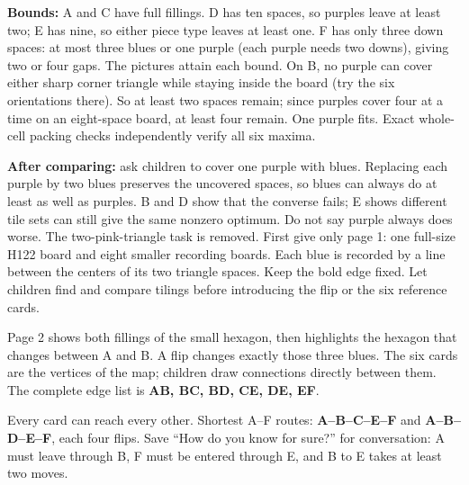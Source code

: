 \documentclass[11pt]{article}
\begin{document}
\textbf{Bounds:} A and C have full fillings. D has ten spaces, so purples leave at least two; E has nine, so either piece type leaves at least one. F has only three down spaces: at most three blues or one purple (each purple needs two downs), giving two or four gaps. The pictures attain each bound. On B, no purple can cover either sharp corner triangle while staying inside the board (try the six orientations there). So at least two spaces remain; since purples cover four at a time on an eight-space board, at least four remain. One purple fits. Exact whole-cell packing checks independently verify all six maxima.

\textbf{After comparing:} ask children to cover one purple with blues. Replacing each purple by two blues preserves the uncovered spaces, so blues can always do at least as well as purples. B and D show that the converse fails; E shows different tile sets can still give the same nonzero optimum. Do not say purple always does worse. The two-pink-triangle task is removed.
\newpage
{}
First give only page 1: one full-size H122 board and eight smaller recording boards. Each blue is recorded by a line between the centers of its two triangle spaces. Keep the bold edge fixed. Let children find and compare tilings before introducing the flip or the six reference cards.

Page 2 shows both fillings of the small hexagon, then highlights the hexagon that changes between A and B. A flip changes exactly those three blues. The six cards are the vertices of the map; children draw connections directly between them. The complete edge list is \textbf{AB, BC, BD, CE, DE, EF}.
\begin{center}\end{center}
Every card can reach every other. Shortest A--F routes: \textbf{A--B--C--E--F} and \textbf{A--B--D--E--F}, each four flips. Save ``How do you know for sure?'' for conversation: A must leave through B, F must be entered through E, and B to E takes at least two moves.
\end{document}
